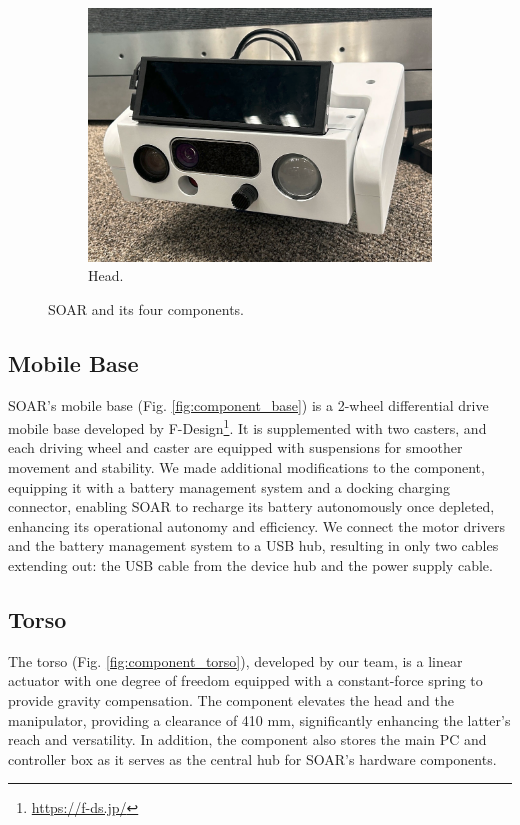 \documentclass[runningheads,a4paper]{llncs}
\begin{document}
\begin{figure}[tbp]
\begin{minipage}[b]{0.25\linewidth}
\begin{subfigure}[b]{\linewidth}
			\includegraphics[width=\linewidth]{images/component_head.png}
			\caption{Head.}
			\label{fig:component_head}
		\end{subfigure}
	\end{minipage}
	\caption{SOAR and its four components.}
	\label{fig:components}
\end{figure}

\subsection{Mobile Base}
SOAR’s mobile base (Fig. \ref{fig:component_base}) is a 2-wheel differential drive mobile base developed by F-Design\footnote{\url{https://f-ds.jp/}}.
It is supplemented with two casters, and each driving wheel and caster are equipped with suspensions for smoother movement and stability.
We made additional modifications to the component, equipping it with a battery management system and a docking charging connector, enabling SOAR to recharge its battery autonomously once depleted, enhancing its operational autonomy and efficiency.
We connect the motor drivers and the battery management system to a USB hub, resulting in only two cables extending out: the USB cable from the device hub and the power supply cable.

\subsection{Torso}
The torso (Fig. \ref{fig:component_torso}), developed by our team, is a linear actuator with one degree of freedom equipped with a constant-force spring to provide gravity compensation.
The component elevates the head and the manipulator, providing a clearance of 410 mm, significantly enhancing the latter's reach and versatility.
In addition, the component also stores the main PC and controller box as it serves as the central hub for SOAR's hardware components.
\end{document}
